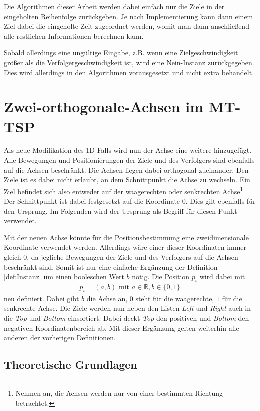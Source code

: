 \documentclass[german,version-2019-11]{uzl-thesis}
\begin{document}
Die Algorithmen dieser Arbeit werden dabei einfach nur die Ziele in der eingeholten Reihenfolge zurückgeben. Je nach Implementierung kann dann einem Ziel dabei die eingeholte Zeit zugeordnet werden, womit man dann anschließend alle restlichen Informationen berechnen kann. 

Sobald allerdings eine ungültige Eingabe, z.B. wenn eine Zielgeschwindigkeit größer als die Verfolgergeschwindigkeit ist, wird eine \glqq Nein\grqq-Instanz zurückgegeben. Dies wird allerdings in den Algorithmen vorausgesetzt und nicht extra behandelt. 

\chapter{Zwei-orthogonale-Achsen im MT-TSP}
\label{kap3}
Als neue Modifikation des 1D-Falls wird nun der Achse eine weitere hinzugefügt. Alle Bewegungen und Positionierungen der Ziele und des Verfolgers sind ebenfalls auf die Achsen beschränkt. Die Achsen liegen dabei orthogonal zueinander. Den Ziele ist es dabei nicht erlaubt, an dem Schnittpunkt die Achse zu wechseln. Ein Ziel befindet sich also entweder auf der waagerechten oder senkrechten Achse\footnote{Nehmen an, die Achsen werden nur von einer bestimmten Richtung betrachtet.}. Der Schnittpunkt ist dabei festgesetzt auf die Koordinate $0$. Dies gilt ebenfalls für den Ursprung. Im Folgenden wird der Ursprung als Begriff für diesen Punkt verwendet. 

Mit der neuen Achse könnte für die Positionsbestimmung eine zweidimensionale Koordinate verwendet werden. Allerdings wäre einer dieser Koordinaten immer gleich $0$, da jegliche Bewegungen der Ziele und des Verfolgers auf die Achsen beschränkt sind. Somit ist nur eine einfache Ergänzung der Definition \ref{def:Instanz} um einen booleschen Wert $b$ nötig. Die Position $p_i$ wird dabei mit 
\begin{align*}
p_i = (a, b) \text{ mit } a\in\mathbb{R}, b\in \{0,1\}
\end{align*}
neu definiert. Dabei gibt $b$ die Achse an, $0$ steht für die waagerechte, $1$ für die senkrechte Achse. Die Ziele werden nun neben den Listen \emph{Left} und \emph{Right} auch in die \emph{Top} und \emph{Bottom} einsortiert. Dabei deckt \emph{Top} den positiven und \emph{Bottom} den negativen Koordinatenbereich ab. Mit dieser Ergänzung gelten weiterhin alle anderen der vorherigen Definitionen.

\section{Theoretische Grundlagen}
\end{document}
